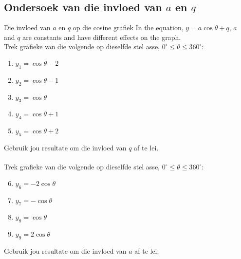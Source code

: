 \subsection*{Ondersoek van die invloed van $a$ en $q$}
\nopagebreak
\begin{Investigation}{Die invloed van $a$ en $q$ op die cosine grafiek}
In the equation, $y=a\cos\theta+q$, $a$ and $q$ are constants and have different effects on the graph.\\

Trek grafieke van die volgende op dieselfde stel asse, $0^{\circ} \leq \theta \leq 360^{\circ}$:
\begin{enumerate}[noitemsep, label=\textbf{\arabic*}. ] 
\item $y_1=\cos\theta -2$
\item $y_2=\cos\theta -1$
\item $y_3=\cos\theta $
\item $y_4=\cos\theta +1$
\item $y_5=\cos\theta +2$
\end{enumerate}
Gebruik jou resultate om die invloed van $q$ af te lei.\\
\\
Trek grafieke van die volgende op dieselfde stel asse, $0^{\circ} \leq \theta \leq 360^{\circ}$:
\begin{enumerate}[noitemsep, label=\textbf{\arabic*}. ] 
\setcounter{enumi}{5}
\item $y_6=-2\cos\theta $
\item $y_7=-\cos\theta $
\item $y_8=\cos\theta $
\item $y_9=2\cos\theta $\end{enumerate}
Gebruik jou resultate om die invloed van $a$ af te lei.
\end{Investigation}

